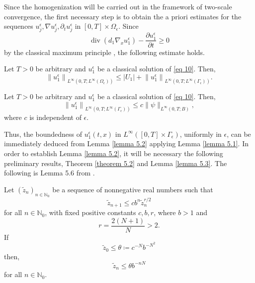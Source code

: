 Since the homogenization will be carried out in the framework of two-scale convergence, the first necessary step is to obtain the a priori estimates for the sequences $u_{j}^{\epsilon}, \nabla u_{j}^{\epsilon}, \partial_{t} u_{j}^{\epsilon}$ in $[0, T] \times \Omega_{\epsilon}$.
Since
$$
\operatorname{div}\left(d_{1} \nabla_{x} u_{1}^{\epsilon}\right)-\frac{\partial u_{1}^{\epsilon}}{\partial t} \geq 0
$$
by the classical maximum principle \cite{Protter_Weinberger_1984}, the following estimate holds.
\begin{lemma} Let $T>0$ be arbitrary and $u_{1}^{\epsilon}$ be a classical solution of \eqref{eq 10}. Then,
\begin{equation} \left\|u_{1}^{\epsilon}\right\|_{L^{\infty}\left(0, T ; L^{\infty}\left(\Omega_{\epsilon}\right)\right)} \leq\left|U_{1}\right|+\left\|u_{1}^{\epsilon}\right\|_{L^{\infty}\left(0, T ; L^{\infty}\left(\Gamma_{\epsilon}\right)\right)}. 
\label{eq 20}\end{equation}
\label{lemma 5.1}\end{lemma}
\begin{lemma} Let $T>0$ be arbitrary and $u_{1}^{\epsilon}$ be a classical solution of \eqref{eq 10}. Then,
\begin{equation}
    \left\|u_{1}^{\epsilon}\right\|_{L^{\infty}\left(0, T ; L^{\infty}\left(\Gamma_{\epsilon}\right)\right)} \leq c\|\psi\|_{L^{\infty}(0, T ; B)},
\label{eq 21}\end{equation}where $c$ is independent of $\epsilon$.
\label{lemma 5.2}\end{lemma}
Thus, the boundedness of $u_{1}^{\epsilon}(t, x)$ in $L^{\infty}\left([0, T] \times \Gamma_{\epsilon}\right)$, uniformly in $\epsilon$, can be immediately deduced from Lemma \eqref{lemma 5.2} applying Lemma \eqref{lemma 5.1}.
In order to establish Lemma \eqref{lemma 5.2}, it will be necessary the following preliminary results, Theorem \eqref{theorem 5.2} and Lemma \eqref{lemma 5.3}.
The following is Lemma 5.6 from \cite{Ladyzenskaja_Solonnikov_Uralceva_1968}.
\begin{lemma}Let $\left(\tilde{z}_{n}\right)_{n \in \mathbb{N}_{0}}$ be a sequence of nonnegative real numbers such that
\begin{equation}
    \tilde{z}_{n+1} \leq c b^{n} \tilde{z}_{n}^{r / 2}   
    \label{eq 22}
\end{equation}
for all $n \in \mathbb{N}_{0}$, with fixed positive constants $c, b, r$, where $b>1$ and
$$
    r=\frac{2(N+1)}{N}>2 .
$$
If
\begin{equation}
    \tilde{z}_{0} \leq \theta\coloneqq c^{-N} b^{-N^{2}}
\label{eq 23}
\end{equation}
then,
\begin{equation}
    \tilde{z}_{n} \leq \theta b^{-n N}
\label{eq 24}
\end{equation}
for all $n \in \mathbb{N}_{0}$.
\label{lemma 5.3}
\end{lemma}
